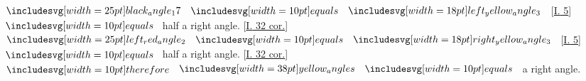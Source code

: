 \documentclass[12pt,preview]{standalone}
\begin{document}
\begin{minipage}[t]{0.64\textwidth}
    \hfill

    \begin{center}
        $\img{black_angle_17} \bequals \img[0][0][18]{left_yellow_angle_3}$ [\hyperref[book1pr5]{\textsc{I.} 5}] $\bequals$ half a right angle. [\hyperref[book1pr32]{\textsc{I.} 32 cor.}]\\
        $\img{left_red_angle_2} \bequals \img[0][0][18]{right_yellow_angle_3}$ [\hyperref[book1pr5]{\textsc{I.} 5}] $\bequals$ half a right angle. [\hyperref[book1pr32]{\textsc{I.} 32 cor.}]\\
        $\btherefore \img[0][0][38]{yellow_angles} \bequals$ a right angle.
    \end{center}\

\end{minipage}

\hfill

\hfill

\pagebreak
\end{document}
